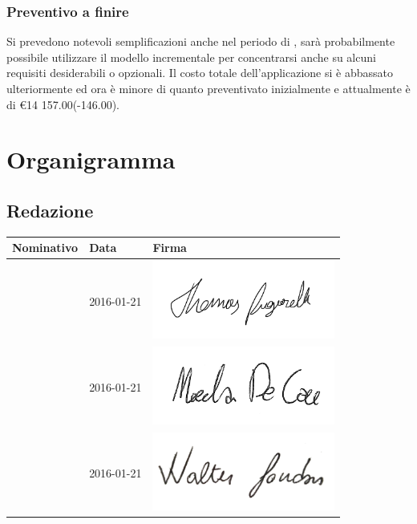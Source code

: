 \documentclass[12pt,a4paper]{article}
\begin{document}
\subsubsection{Preventivo a finire}
Si prevedono notevoli semplificazioni anche nel periodo di \FC{}, sarà probabilmente possibile utilizzare il modello incrementale per concentrarsi anche su alcuni requisiti desiderabili o opzionali. Il costo totale dell'applicazione si è abbassato ulteriormente ed ora è minore di quanto preventivato inizialmente e attualmente è di \euro{}14 157.00(-146.00).

\newpage

\appendix
\section{Organigramma}

\subsection{Redazione}

\begin{table}[H]
	\begin{center}
		\begin{tabular}{l l l}
			\toprule
            \textbf{Nominativo}	& \textbf{Data} & \textbf{Firma} \\ \midrule
			\midrule
            \TP{} & 2016-01-21 & \includegraphics[width=6cm]{../img/firmaPigarelli.png} \\ \midrule
            \NDC{} & 2016-01-21 & \includegraphics[width=6cm]{../img/firmaDeCao.png} \\ \midrule
			\WS{} & 2016-01-21 & \includegraphics[width=6cm]{../img/firmaSandon.png} \\
			\bottomrule
		\end{tabular}
	\end{center}
\end{table}
\end{document}

